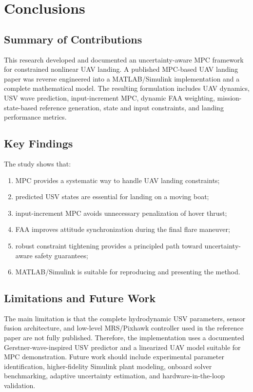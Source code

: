 \documentclass[12pt,a4paper]{report}
\begin{document}
\chapter{Conclusions}

\section{Summary of Contributions}
This research developed and documented an uncertainty-aware MPC framework for constrained nonlinear UAV landing. A published MPC-based UAV landing paper was reverse engineered into a MATLAB/Simulink implementation and a complete mathematical model. The resulting formulation includes UAV dynamics, USV wave prediction, input-increment MPC, dynamic FAA weighting, mission-state-based reference generation, state and input constraints, and landing performance metrics.

\section{Key Findings}
The study shows that:
\begin{enumerate}
    \item MPC provides a systematic way to handle UAV landing constraints;
    \item predicted USV states are essential for landing on a moving boat;
    \item input-increment MPC avoids unnecessary penalization of hover thrust;
    \item FAA improves attitude synchronization during the final flare maneuver;
    \item robust constraint tightening provides a principled path toward uncertainty-aware safety guarantees;
    \item MATLAB/Simulink is suitable for reproducing and presenting the method.
\end{enumerate}

\section{Limitations and Future Work}
The main limitation is that the complete hydrodynamic USV parameters, sensor fusion architecture, and low-level MRS/Pixhawk controller used in the reference paper are not fully published. Therefore, the implementation uses a documented Gerstner-wave-inspired USV predictor and a linearized UAV model suitable for MPC demonstration. Future work should include experimental parameter identification, higher-fidelity Simulink plant modeling, onboard solver benchmarking, adaptive uncertainty estimation, and hardware-in-the-loop validation.
\end{document}
